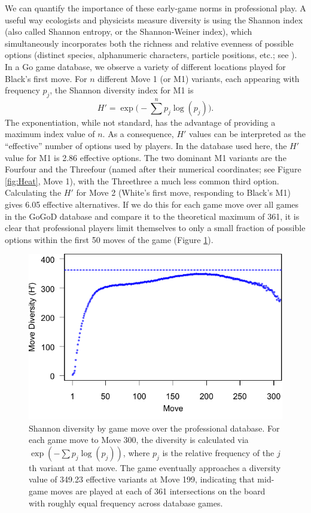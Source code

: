 We can quantify the importance of these early-game norms in professional play.  A useful way ecologists and physicists measure diversity is using the Shannon index (also called Shannon entropy, or the Shannon-Weiner index), which simultaneously incorporates both the richness and relative evenness of possible options (distinct species, alphanumeric characters, particle positions, etc.; see \citealt{Begon2006}).  In a Go game database, we observe a variety of different locations played for Black's first move.  For $n$ different Move 1 (or M1) variants, each appearing with frequency $p_j$, the Shannon diversity index for M1 is
	\[ 	H' = \exp\bigg( - \sum^{n} p_j \log(p_j) \bigg).
\]
The exponentiation, while not standard, has the advantage of providing a maximum index value of $n$. As a consequence, $H'$ values can be interpreted as the ``effective'' number of options used by players.  In the database used here, the $H'$ value for M1 is 2.86 effective options.  The two dominant M1 variants are the Fourfour and the Threefour (named after their numerical coordinates; see Figure \ref{fig:Heat}, Move 1), with the Threethree a much less common third option.  Calculating the $H'$ for Move 2 (White's first move, responding to Black's M1) gives 6.05 effective alternatives.  If we do this for each game move over all games in the GoGoD database and compare it to the theoretical maximum of 361, it is clear that professional players limit themselves to only a small fraction of possible options within the first 50 moves of the game (Figure \ref{fig:Shannon}).    

\begin{figure}[t]
\begin{center} 
\includegraphics[scale=1.0]{figures/gofirstmove/figShannon.pdf}
\caption{Shannon diversity by game move over the professional database.  For each game move to Move 300, the diversity is calculated via $\exp(-\sum p_j \log(p_j))$, where $p_j$ is the relative frequency of the $j$th variant at that move.  The game eventually approaches a diversity value of 349.23 effective variants at Move 199, indicating that mid-game moves are played at each of 361 intersections on the board with roughly equal frequency across database games.}
\label{fig:Shannon}
\end{center}
\end{figure}

